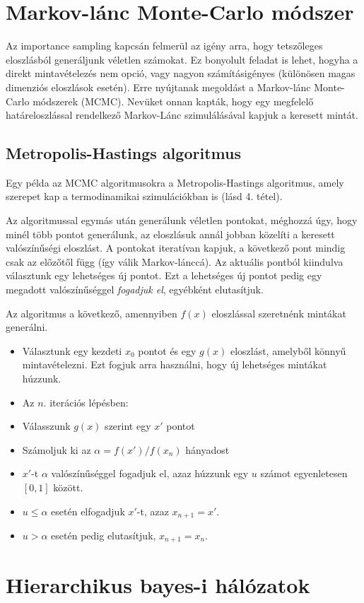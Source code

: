 \documentclass[12pt]{article}
\theoremstyle{plain}
\begin{document}
\section{Markov-lánc Monte-Carlo módszer}
Az importance sampling kapcsán felmerül az igény arra, hogy tetszőleges eloszlásból generáljunk véletlen számokat. Ez bonyolult feladat is lehet, hogyha a direkt mintavételezés nem opció, vagy nagyon számításigényes (különösen magas dimenziós eloszlások esetén). Erre nyújtanak megoldást a Markov-lánc Monte-Carlo módszerek (MCMC). Nevüket onnan kapták, hogy egy megfelelő határeloszlással rendelkező Markov-Lánc szimulálásával kapjuk a keresett mintát. 
\subsection{Metropolis-Hastings algoritmus}
Egy példa az MCMC algoritmusokra a Metropolis-Hastings algoritmus, amely szerepet kap a termodinamikai szimulációkban is (lásd 4. tétel). 

Az algoritmussal egymás után generálunk véletlen pontokat, méghozzá úgy, hogy minél több pontot generálunk, az eloszlásuk annál jobban közelíti a keresett valószínűségi eloszlást. A pontokat iteratívan kapjuk, a következő pont mindig csak az előzőtől függ (így válik Markov-lánccá). 
Az aktuális pontból kiindulva választunk egy lehetséges új pontot. Ezt a lehetséges új pontot pedig egy megadott valószínűséggel {\em fogadjuk el}, egyébként elutasítjuk. 

Az algoritmus a következő, amennyiben $f(x)$ eloszlással szeretnénk mintákat generálni.
\begin{itemize}
    \item Választunk egy kezdeti $x_0$ pontot és egy $g(x)$ eloszlást, amelyből könnyű mintavételezni. Ezt fogjuk arra használni, hogy új lehetséges mintákat húzzunk. 
    \item Az $n.$ iterációs lépésben:
    \item Válasszunk $g(x)$ szerint egy $x'$ pontot
    \item Számoljuk ki az $\alpha = f(x')/f(x_n)$ hányadost
    \item $x'$-t $\alpha$ valószínűséggel fogadjuk el, azaz húzzunk egy $u$ számot egyenletesen $[0,1]$ között. 
    \item $u\leq \alpha$  esetén elfogadjuk $x'$-t, azaz $x_{n+1} = x'$.
    \item $u > \alpha$ esetén pedig elutasítjuk, $x_{n+1} = x_n$.
\end{itemize}
\section{Hierarchikus bayes-i hálózatok}


\end{document}
